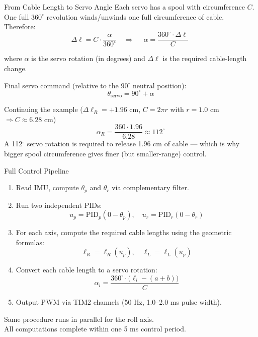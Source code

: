 \documentclass[10pt]{beamer}
\begin{document}
\begin{frame}{From Cable Length to Servo Angle}
  Each servo has a spool with circumference $C$. One full $360^\circ$ revolution winds/unwinds one full circumference of cable. Therefore:
  \[
    \Delta\ell = C \cdot \frac{\alpha}{360^\circ}
    \quad \Longrightarrow \quad
    \boxed{\;\alpha = \frac{360^\circ \cdot \Delta\ell}{C}\;}
  \]

  where $\alpha$ is the servo rotation (in degrees) and $\Delta\ell$ is the required cable-length change.

  \medskip
  Final servo command (relative to the $90^\circ$ neutral position):
  \[
    \theta_{\text{servo}} = 90^\circ + \alpha
  \]

  \begin{block}{Continuing the example ($\Delta\ell_R = +1.96$ cm, $C = 2\pi r$ with $r = 1.0$ cm $\Rightarrow C \approx 6.28$ cm)}
    \footnotesize
    \[
      \alpha_R = \frac{360 \cdot 1.96}{6.28} \approx 112^\circ
    \]
    A 112$^\circ$ servo rotation is required to release 1.96 cm of cable — which is why bigger spool circumference gives finer (but smaller-range) control.
  \end{block}
\end{frame}

\begin{frame}{Full Control Pipeline}
  \begin{enumerate}
    \item Read IMU, compute $\theta_p$ and $\theta_r$ via complementary filter.
    \item Run two independent PIDs:
      \[ u_p = \mathrm{PID}_p(0 - \theta_p), \quad u_r = \mathrm{PID}_r(0 - \theta_r) \]
    \item For each axis, compute the required cable lengths using the geometric formulas:
      \[ \ell_R = \ell_R(u_p), \quad \ell_L = \ell_L(u_p) \]
    \item Convert each cable length to a servo rotation:
      \[ \alpha_i = \frac{360^\circ \cdot \bigl(\ell_i - (a+b)\bigr)}{C} \]
    \item Output PWM via TIM2 channels (50 Hz, 1.0--2.0 ms pulse width).
  \end{enumerate}

  Same procedure runs in parallel for the roll axis.\\
  All computations complete within one 5 ms control period.
\end{frame}
\end{document}
